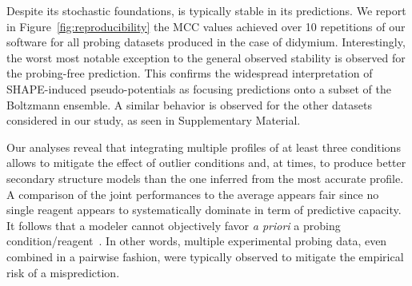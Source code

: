 \documentclass[a4,center,fleqn]{NAR}
\begin{document}
Despite its stochastic foundations, \OurTool{} is typically stable in its predictions. We report in Figure~\ref{fig:reproducibility} the MCC values achieved over  10 repetitions of our software for all probing datasets produced in the case of didymium. 
Interestingly, the worst most notable exception to the general observed stability is observed for the probing-free prediction. This confirms the widespread interpretation of SHAPE-induced pseudo-potentials as focusing predictions onto a subset of the Boltzmann ensemble. A similar behavior is observed for the other datasets considered in our study, as seen in Supplementary Material. %



Our analyses reveal that integrating multiple profiles of at least three conditions allows to mitigate the effect of outlier conditions and, at times, to produce better secondary structure models than the one inferred from the most accurate profile. A comparison of the joint performances to the average appears fair since no single reagent appears to systematically dominate in term of predictive capacity. It follows that a modeler cannot objectively favor \emph{a priori} a probing condition/reagent~\cite{Yu2018}. In other words, multiple experimental probing data, even combined in a pairwise fashion, were typically observed to mitigate the empirical risk of a misprediction. 
\end{document}
